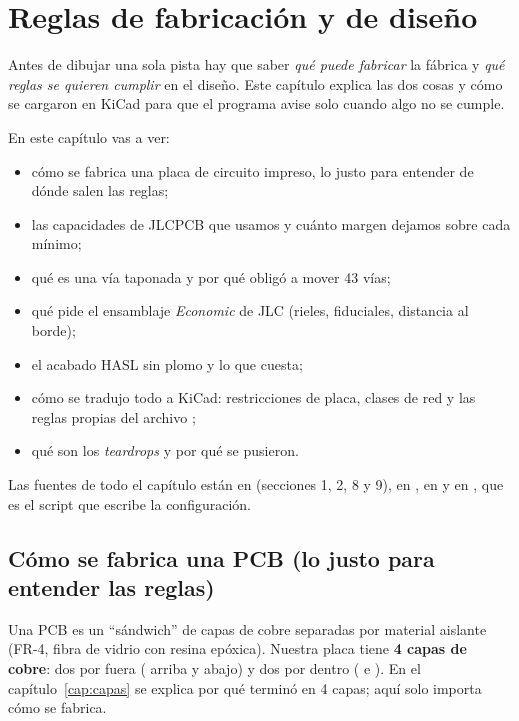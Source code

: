 \chapter{Reglas de fabricación y de diseño}\label{cap:jlc}
\providecommand{\regla}[1]{\texttt{#1}}

Antes de dibujar una sola pista hay que saber \emph{qué puede fabricar} la fábrica y \emph{qué reglas se
quieren cumplir} en el diseño. Este capítulo explica las dos cosas y cómo se cargaron en KiCad para que el
programa avise solo cuando algo no se cumple.

En este capítulo vas a ver:
\begin{itemize}
  \item cómo se fabrica una placa de circuito impreso, lo justo para entender de dónde salen las reglas;
  \item las capacidades de JLCPCB que usamos y cuánto margen dejamos sobre cada mínimo;
  \item qué es una vía taponada y por qué obligó a mover 43 vías;
  \item qué pide el ensamblaje \emph{Economic} de JLC (rieles, fiduciales, distancia al borde);
  \item el acabado HASL sin plomo y lo que cuesta;
  \item cómo se tradujo todo a KiCad: restricciones de placa, clases de red y las reglas propias del archivo
        ;
  \item qué son los \emph{teardrops} y por qué se pusieron.
\end{itemize}

Las fuentes de todo el capítulo están en  (secciones 1, 2, 8 y 9), en
, en  y en , que es el script que
escribe la configuración.

\section{Cómo se fabrica una PCB (lo justo para entender las reglas)}\label{sec:c06-fabricacion}

Una PCB es un ``sándwich'' de capas de cobre separadas por material aislante (FR-4, fibra de vidrio con resina
epóxica). Nuestra placa tiene \textbf{4 capas de cobre}: dos por fuera ( arriba y  abajo) y
dos por dentro ( e ). En el capítulo~\ref{cap:capas} se explica por qué terminó en 4
capas; aquí solo importa cómo se fabrica.

